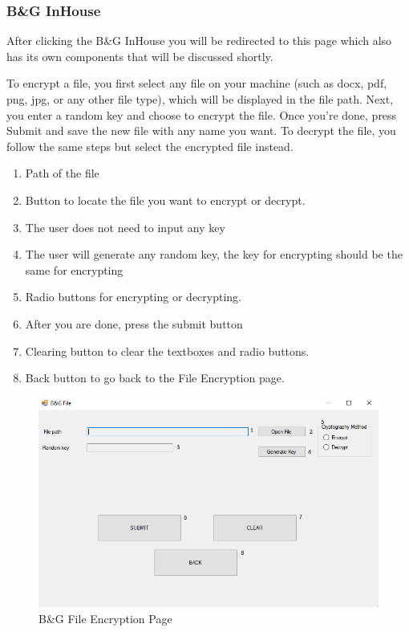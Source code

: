 \subsubsection{B\&G InHouse}
After clicking the B\&G InHouse you will be redirected to this page which also has its own components that will be discussed shortly.

To encrypt a file, you first select any file on your machine (such as docx, pdf, png, jpg, or any other file type), which will be displayed in the file path. Next, you enter a random key and choose to encrypt the file. Once you're done, press Submit and save the new file with any name you want. To decrypt the file, you follow the same steps but select the encrypted file instead.

\begin{enumerate}
   \item Path of the file
   \item Button to locate the file you want to encrypt or decrypt.
   \item The user does not need to input any key
   \item The user will generate any random key, the key for encrypting should be the same for encrypting
   \item Radio buttons for encrypting or decrypting.
   \item After you are done, press the submit button
   \item Clearing button to clear the textboxes and radio buttons.
   \item Back button to go back to the File Encryption page.
\end{enumerate}


\begin{figure}[h!]
\centering
\includegraphics[scale=0.5]{Diagrams/customfil.png}
\caption{B\&G File Encryption Page}
\label{fig:figure1}
\end{figure}

